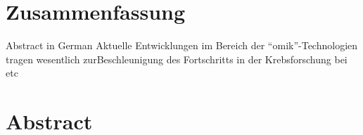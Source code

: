 \documentclass[11pt, a4paper, twosided]{book}
\begin{document}
    \hypertarget{zusammenfassung}{%
    \chapter*{Zusammenfassung}\label{zusammenfassung}}

    Abstract in German
    Aktuelle Entwicklungen im Bereich der ``omik''-Technologien tragen wesentlich zurBeschleunigung des Fortschritts in der Krebsforschung bei etc
\newpage\null\newpage


    \hypertarget{abstract}{%
    \chapter*{Abstract}\label{abstract}}
\end{document}
